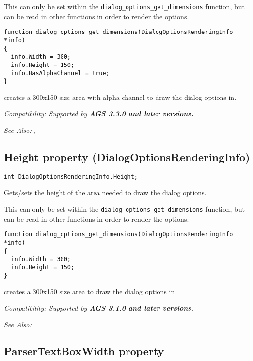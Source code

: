 This can only be set within the \verb$dialog_options_get_dimensions$ function, but
can be read in other functions in order to render the options.

\begin{verbatim}
function dialog_options_get_dimensions(DialogOptionsRenderingInfo *info)
{
  info.Width = 300;
  info.Height = 150;
  info.HasAlphaChannel = true;
}
\end{verbatim}
creates a 300x150 size area with alpha channel to draw the dialog options in.

\it{Compatibility:} Supported by \bf{AGS 3.3.0} and later versions.

\it{See Also:}
,


\subsection{Height property (DialogOptionsRenderingInfo)}\label{DialogOptionsRenderingInfo.Height}%

\begin{verbatim}
int DialogOptionsRenderingInfo.Height;
\end{verbatim}
Gets/sets the height of the area needed to draw the dialog options.

This can only be set within the \verb$dialog_options_get_dimensions$ function, but
can be read in other functions in order to render the options.

\begin{verbatim}
function dialog_options_get_dimensions(DialogOptionsRenderingInfo *info)
{
  info.Width = 300;
  info.Height = 150;
}
\end{verbatim}
creates a 300x150 size area to draw the dialog options in

\it{Compatibility:} Supported by \bf{AGS 3.1.0} and later versions.

\it{See Also:} 


\subsection{ParserTextBoxWidth property}\label{DialogOptionsRenderingInfo.ParserTextBoxWidth}%

